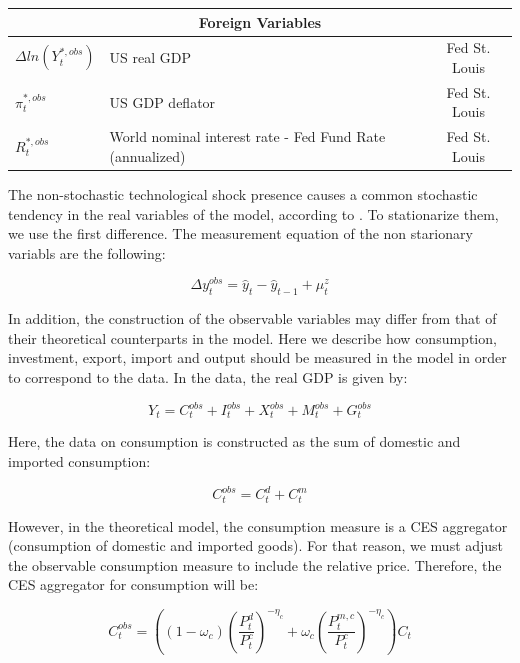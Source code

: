 \documentclass[12pt,oneside,a4paper]{article}
\begin{document}
\begin{table}[H]
\begin{tabular}{llc}
\multicolumn{3}{c}{Foreign Variables}                                                                   \\ \hline
$\Delta ln(Y_t^{*, obs})$                          & US real GDP                                              & Fed St. Louis \\ 
$\pi_t^{*, obs}$                         & US GDP deflator                                          & Fed St. Louis \\ 
$R_t^{*, obs}$                          & World nominal interest rate - Fed Fund Rate (annualized) & Fed St. Louis \\ \hline
\end{tabular}
\end{table}


The non-stochastic technological shock presence causes a common stochastic tendency in the real variables of the model, according to \citet{Altig:2011}. To stationarize them, we use the first difference. The measurement equation of the non starionary variabls are the following:

\begin{equation}
    \Delta y_t^{obs} = \widehat{y}_{t} - \widehat{y}_{t-1} + \mu_t^{z}
\end{equation}

 In addition, the construction of the observable variables may differ from that of their theoretical counterparts in the model. Here we describe how consumption, investment, export, import and output should be measured in the
model in order to correspond to the data. In the data, the real GDP is given by:

\begin{equation}
    Y_t = C_t^{obs} + I_t^{obs} + X_t^{obs} + M_t^{obs} + G_t^{obs}
\end{equation}

Here, the data on consumption is constructed as the sum of domestic and imported consumption:

\begin{equation}
\label{Eq.consumo_medida}
    C_t^{obs} = C_t^{d} + C_t^{m}
\end{equation}

However, in the theoretical model, the consumption measure is a CES aggregator (consumption of domestic and imported goods). For that reason, we must adjust the observable consumption measure to include the relative price. Therefore, the CES aggregator for consumption will be:

\begin{equation}
    C_t^{obs} =\left((1-\omega_c)\left(\dfrac{P_t^{d}}{P_t^{c}} \right)^{-\eta_c}  + \omega_c\left(\dfrac{P_t^{m,c}}{P_t^{c}} \right)^{-\eta_c}  \right)C_t
\end{equation}
\end{document}

